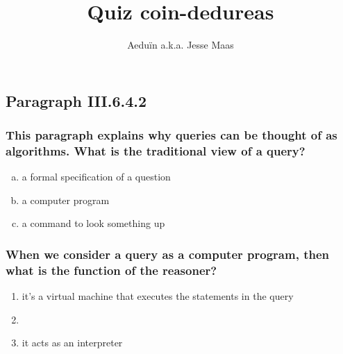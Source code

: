 \documentclass[a4paper, 12pt]{article}
\begin{document}
\title{Quiz coin-dedureas}
\author{Aeduïn a.k.a. Jesse Maas}
\maketitle

\section{}
\subsection{Paragraph III.6.4.2}
\subsubsection{This paragraph explains why queries can be thought of as algorithms. What is the traditional view of a query?}

\begin{enumerate}[(a)]
\item a formal specification of a question %
\item a computer program
\item a command to look something up
\end{enumerate}

\subsubsection{When we consider a query as a computer program, then what is the function of the reasoner?}

\begin{enumerate}
\item it's a virtual machine that executes the statements in the query
\item 
\item it acts as an interpreter %
\end{enumerate}
\end{document}
